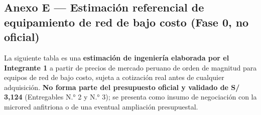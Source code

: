 \documentclass[11pt,a4paper]{article}
\begin{document}
\subsection{Anexo E --- Estimación referencial de equipamiento de red de bajo costo (Fase 0, no oficial)}\label{anexo-e-estimaciuxf3n-referencial-de-equipamiento-de-red-de-bajo-costo-fase-0-no-oficial}

La siguiente tabla es una \textbf{estimación de ingeniería elaborada por el Integrante 1} a partir de precios de mercado peruano de orden de magnitud para equipos de red de bajo costo, sujeta a cotización real antes de cualquier adquisición. \textbf{No forma parte del presupuesto oficial y validado de S/ 3,124} (Entregables N.° 2 y N.° 3); se presenta como insumo de negociación con la microred anfitriona o de una eventual ampliación presupuestal.
\end{document}
